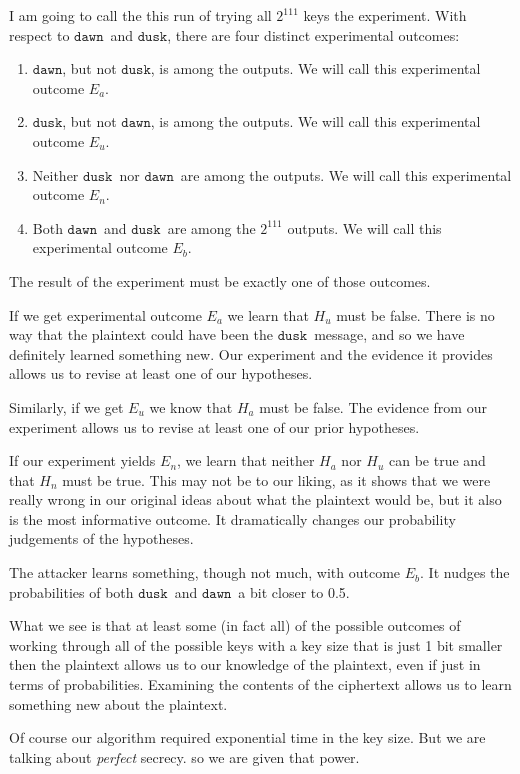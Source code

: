 \documentclass[11pt]{article}
\newcommand\mdusk{\ensuremath{\mathtt{dusk}}}
\newcommand\mdawn{\ensuremath{\mathtt{dawn}}}
\begin{document}
I am going to call the this run of trying all $2^{111}$ keys the experiment. 
With respect to \mdawn\ and \mdusk, there are four distinct experimental outcomes:

\begin{enumerate}
    \item\label{en:dawn} \mdawn, but not \mdusk, is among the outputs.
        We will call this experimental outcome $E_a$.
    \item\label{en:dusk} \mdusk, but not \mdawn, is among the outputs.
        We will call this experimental outcome $E_u$.
    \item\label{en:neither} Neither \mdusk\ nor \mdawn\ are among the outputs.
    We will call this experimental outcome $E_n$.
    \item\label{en:both} Both \mdawn\ and \mdusk\ are among the $2^{111}$ outputs.
    We will call this experimental outcome $E_b$.
\end{enumerate}
The result of the experiment must be exactly one of those outcomes.

If we get experimental outcome $E_a$
we learn that $H_u$ must be false.
There is no way that the plaintext could have been the \mdusk\ message,
and so we have definitely learned something new.
Our experiment and the evidence it provides allows us to revise at least one of our hypotheses.

Similarly, if we get $E_u$ we know that $H_a$ must be false.
The evidence from our experiment allows us to revise at least one of our prior hypotheses.

If our experiment yields $E_n$,
we learn that neither $H_a$ nor $H_u$ can be true and that $H_n$ must be true.
This may not be to our liking, as it shows that we were really wrong in our
original ideas about what the plaintext would be, but it also is the most informative outcome. It dramatically changes our probability judgements of the hypotheses.

The attacker learns something, though not much, with outcome $E_b$.
It nudges the probabilities of both \mdusk\ and \mdawn\ a bit closer to 0.5.

What we see is that at least some (in fact all) of the possible outcomes of working through all of the possible keys with a key size that is just 1 bit smaller then the plaintext allows us to our knowledge of the plaintext, even if just in terms of probabilities.
Examining the contents of the ciphertext allows us to learn something new about the plaintext.

Of course our algorithm required exponential time in the key size.
But we are talking about \emph{perfect} secrecy. so we are given that power.
\end{document}
